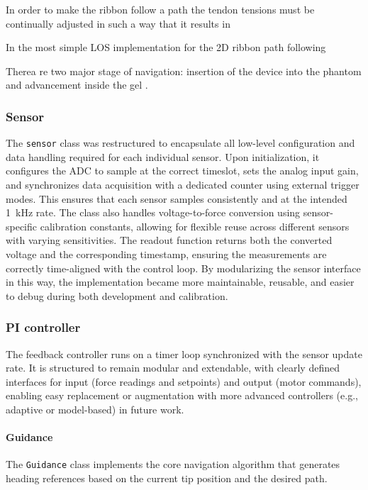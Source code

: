 
In order to make the ribbon follow a path the tendon tensions must be continually adjusted in such a way that it results in 

In the most simple LOS implementation for the 2D ribbon path following 

Therea re two major stage of navigation: insertion of the device into the phantom and advancement inside the gel \cite{noseda_flat_2024}. 

\subsubsection{Sensor}
The \texttt{sensor} class was restructured to encapsulate all low-level configuration and data handling required for each individual sensor. Upon initialization, it configures the ADC to sample at the correct timeslot, sets the analog input gain, and synchronizes data acquisition with a dedicated counter using external trigger modes. This ensures that each sensor samples consistently and at the intended \SI{1}{\kilo\hertz} rate. The class also handles voltage-to-force conversion using sensor-specific calibration constants, allowing for flexible reuse across different sensors with varying sensitivities. The readout function returns both the converted voltage and the corresponding timestamp, ensuring the measurements are correctly time-aligned with the control loop. By modularizing the sensor interface in this way, the implementation became more maintainable, reusable, and easier to debug during both development and calibration.

\subsubsection{PI controller}
The feedback controller runs on a timer loop synchronized with the sensor update rate. It is structured to remain modular and extendable, with clearly defined interfaces for input (force readings and setpoints) and output (motor commands), enabling easy replacement or augmentation with more advanced controllers (e.g., adaptive or model-based) in future work.


\paragraph*{Guidance}
The \texttt{Guidance} class implements the core navigation algorithm that generates heading references based on the current tip position and the desired path.

